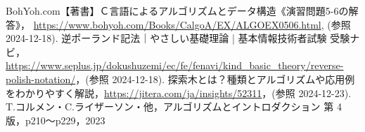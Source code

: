 \documentclass{ltjsarticle}
\begin{document}
\begin{thebibliography}{9}
   BohYoh.com【著書】Ｃ言語によるアルゴリズムとデータ構造《演習問題5-6の解答》， \url{https://www.bohyoh.com/Books/CalgoA/EX/ALGOEX0506.html}, (参照 2024-12-18).
   逆ポーランド記法｜やさしい基礎理論 | 基本情報技術者試験 受験ナビ，\url{https://www.seplus.jp/dokushuzemi/ec/fe/fenavi/kind_basic_theory/reverse-polish-notation/}，(参照 2024-12-18).
   探索木とは？種類とアルゴリズムや応用例をわかりやすく解説，\url{https://jitera.com/ja/insights/52311}，(参照 2024-12-23).
   T.コルメン・C.ライザーソン・他，アルゴリズムとイントロダクション 第 4 版，p210～p229，2023
\end{thebibliography}
\end{document}
